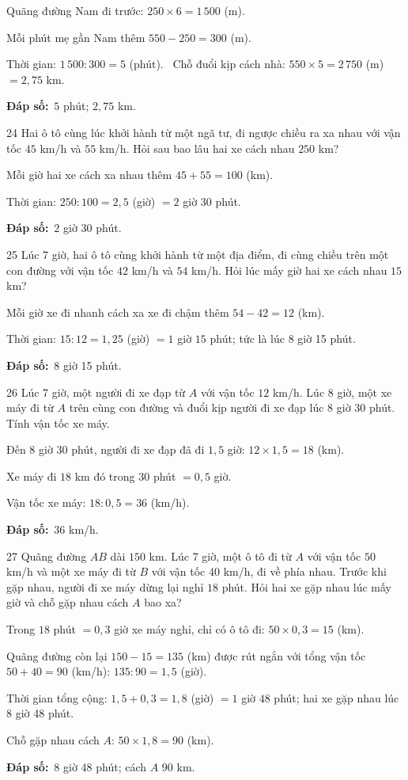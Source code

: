 \documentclass[11pt]{article}
\newif\ifsol \solfalse
\providecommand{\AnsWord}{Đáp số}
\newcommand{\dapso}[1]{\par\textbf{\AnsWord:}\ #1}
\newcommand{\probsol}[1]{%
  \begin{lrbox}{\solmeasure}\begin{minipage}{\dimexpr\linewidth-24pt\relax}#1\end{minipage}\end{lrbox}%
  \ifsol
    \begin{solbox}#1\end{solbox}%
  \else
    \setlength{\solht}{\dimexpr\ht\solmeasure+\dp\solmeasure+0.85cm\relax}%
    \ifdim\solht<1.35cm\setlength{\solht}{1.35cm}\fi
    \begin{tcolorbox}[colback=white,colframe=Line,boxrule=0.8pt,arc=5pt,
      left=8pt,right=8pt,top=4pt,bottom=4pt,height=\solht]{\footnotesize\color{Slate}\itshape\WorkWord}\end{tcolorbox}%
  \fi}
\newcommand{\gap}{\vspace{0.3cm}}
\def\WorkWord{Bài làm:}
\def\AnsWord{Đáp số}
\begin{document}
\probsol{
Quãng đường Nam đi trước: $250\times6=1\,500$ (m).\par Mỗi phút mẹ gần Nam thêm $550-250=300$ (m).\par
Thời gian: $1\,500:300=5$ (phút). \ Chỗ đuổi kịp cách nhà: $550\times5=2\,750$ (m) $=2{,}75$ km.
\dapso{$5$ phút; $2{,}75$ km.}}
\gap
\begin{probbox}{24}{\relax}
Hai ô tô cùng lúc khởi hành từ một ngã tư, đi ngược chiều ra xa nhau với vận tốc $45$ km/h và $55$ km/h. Hỏi sau bao lâu hai xe cách nhau $250$ km?
\end{probbox}
\probsol{
Mỗi giờ hai xe cách xa nhau thêm $45+55=100$ (km).\par Thời gian: $250:100=2{,}5$ (giờ) $=2$ giờ $30$ phút.
\dapso{$2$ giờ $30$ phút.}}
\gap
\begin{probbox}{25}{\relax}
Lúc 7 giờ, hai ô tô cùng khởi hành từ một địa điểm, đi cùng chiều trên một con đường với vận tốc $42$ km/h và $54$ km/h. Hỏi lúc mấy giờ hai xe cách nhau $15$ km?
\end{probbox}
\probsol{
Mỗi giờ xe đi nhanh cách xa xe đi chậm thêm $54-42=12$ (km).\par Thời gian: $15:12=1{,}25$ (giờ) $=1$ giờ $15$ phút; tức là lúc 8 giờ 15 phút.
\dapso{8 giờ 15 phút.}}
\gap
\begin{probbox}{26}{\relax}
Lúc 7 giờ, một người đi xe đạp từ $A$ với vận tốc $12$ km/h. Lúc 8 giờ, một xe máy đi từ $A$ trên cùng con đường và đuổi kịp người đi xe đạp lúc 8 giờ 30 phút. Tính vận tốc xe máy.
\end{probbox}
\probsol{
Đến 8 giờ 30 phút, người đi xe đạp đã đi $1{,}5$ giờ: $12\times1{,}5=18$ (km).\par Xe máy đi $18$ km đó trong $30$ phút $=0{,}5$ giờ.\par Vận tốc xe máy: $18:0{,}5=36$ (km/h).
\dapso{$36$ km/h.}}
\gap
\begin{probbox}{27}{\relax}
Quãng đường $AB$ dài $150$ km. Lúc 7 giờ, một ô tô đi từ $A$ với vận tốc $50$ km/h và một xe máy đi từ $B$ với vận tốc $40$ km/h, đi về phía nhau. Trước khi gặp nhau, người đi xe máy dừng lại nghỉ $18$ phút. Hỏi hai xe gặp nhau lúc mấy giờ và chỗ gặp nhau cách $A$ bao xa?
\end{probbox}
\probsol{
Trong $18$ phút $=0{,}3$ giờ xe máy nghỉ, chỉ có ô tô đi: $50\times0{,}3=15$ (km).\par
Quãng đường còn lại $150-15=135$ (km) được rút ngắn với tổng vận tốc $50+40=90$ (km/h): $135:90=1{,}5$ (giờ).\par
Thời gian tổng cộng: $1{,}5+0{,}3=1{,}8$ (giờ) $=1$ giờ $48$ phút; hai xe gặp nhau lúc 8 giờ 48 phút.\par Chỗ gặp nhau cách $A$: $50\times1{,}8=90$ (km).
\dapso{8 giờ 48 phút; cách $A$ $90$ km.}}
\end{document}
